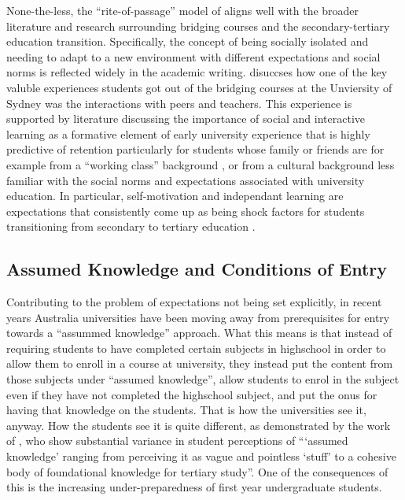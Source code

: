 \documentclass[twoside,12pt,a4paper]{report}
\begin{document}
None-the-less, the ``rite-of-passage'' model of  aligns well with the broader literature and research surrounding bridging courses and the secondary-tertiary education transition. Specifically, the concept of being socially isolated and needing to adapt to a new environment with different expectations and social norms is reflected widely in the academic writing.  disuccses how one of the key valuble experiences students got out of the bridging courses at the Unviersity of Sydney was the interactions with peers and teachers. This experience is supported by literature discussing the importance of social and interactive learning as a formative element of early university experience that is highly predictive of retention \cite{Peat2001, Trotter2006} particularly for students whose family or friends are for example from a ``working class'' background \cite{Leese2010}, or from a cultural background less familiar with the social norms and expectations associated with university education. In particular, self-motivation and independant learning are expectations that consistently come up as being shock factors for students transitioning from secondary to tertiary education \cite{Murtagh2010}.


\subsection*{Assumed Knowledge and Conditions of Entry}

Contributing to the problem of expectations not being set explicitly, in recent years Australia universities have been moving away from prerequisites for entry towards a ``assummed knowledge'' approach. What this means is that instead of requiring students to have completed certain subjects in highschool in order to allow them to enroll in a course at university, they instead put the content from those subjects under ``assumed knowledge'', allow students to enrol in the subject even if they have not completed the highschool subject, and put the onus for having that knowledge on the students. That is how the universities see it, anyway. How the students see it is quite different, as demonstrated by the work of , who show substantial variance in student perceptions of ```assumed knowledge' ranging from perceiving it as vague and pointless `stuff' to a cohesive body of foundational knowledge for tertiary study''. One of the consequences of this is the increasing under-preparedness of first year undergraduate students.
\end{document}
